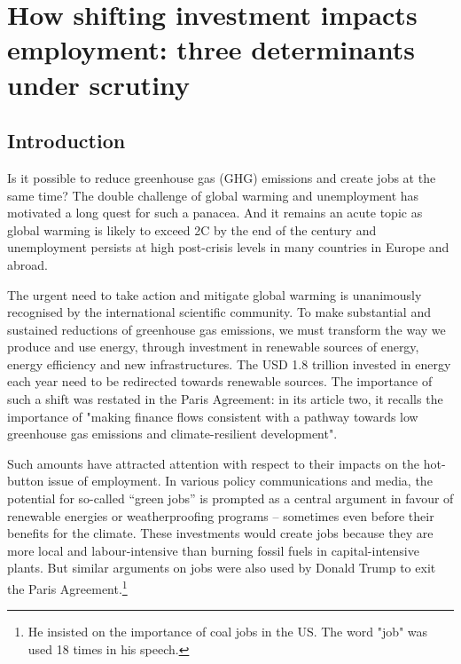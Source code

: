 \chapter{How shifting investment impacts employment: three determinants under scrutiny} \label{chap:mechanisms}

\section{Introduction} \label{Introduction}

Is it possible to reduce greenhouse gas (GHG) emissions and create jobs at the same time? The double challenge of global warming and unemployment has motivated a long quest for such a panacea. And it remains an acute topic as global warming is likely to exceed 2\degree C by the end of the century and unemployment persists at high post-crisis levels in many countries in Europe and abroad.

The urgent need to take action and mitigate global warming is unanimously recognised by the international scientific community. To make substantial and sustained reductions of greenhouse gas emissions, we must transform the way we produce and use energy, through investment in renewable sources of energy, energy efficiency and new infrastructures. The USD 1.8 trillion invested in energy each year \citep{IEAWIR2016} need to be redirected towards renewable sources. The importance of such a shift was restated in the Paris Agreement: in its article two, it recalls the importance of "making finance flows consistent with a pathway towards low greenhouse gas emissions and climate-resilient development". 

Such amounts have attracted attention with respect to their impacts on the hot-button issue of employment. In various policy communications and media, the potential for so-called “green jobs” is prompted as a central argument in favour of renewable energies or weatherproofing programs – sometimes even before their benefits for the climate. These investments would create jobs because they are more local and labour-intensive than burning fossil fuels in capital-intensive plants. But similar arguments on jobs were also used by Donald Trump to exit the Paris Agreement.\footnote{He insisted on the importance of coal jobs in the US. The word "job" was used 18 times in his speech.}


